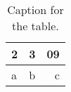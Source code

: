 \documentclass{article}
\begin{document}
\begin{table}[h!]
  \begin{center}
    \caption{Caption for the table.}
    \label{tab:table1}
    \begin{tabular}{l|c||r}
     2&3 & 09\\
      \hline
      a & b & c\\
    \end{tabular}
  \end{center}
\end{table}
\end{document}
